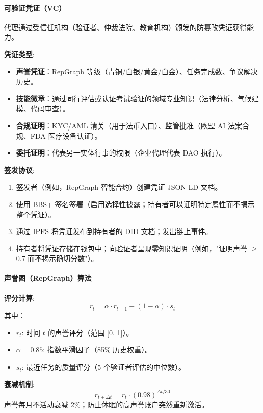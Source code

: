 \documentclass[11pt]{article}
\begin{document}
\paragraph{可验证凭证（VC）}
代理通过受信任机构（验证者、仲裁法院、教育机构）颁发的防篡改凭证获得能力。

\textbf{凭证类型}:
\begin{itemize}[noitemsep]
  \item \textbf{声誉凭证}：RepGraph 等级（青铜/白银/黄金/白金）、任务完成数、争议解决历史。
  \item \textbf{技能徽章}：通过同行评估或认证考试验证的领域专业知识（法律分析、气候建模、代码审查）。
  \item \textbf{合规证明}：KYC/AML 清关（用于法币入口）、监管批准（欧盟 AI 法案合规、FDA 医疗设备认证）。
  \item \textbf{委托证明}：代表另一实体行事的权限（企业代理代表 DAO 执行）。
\end{itemize}

\textbf{签发协议}:
\begin{enumerate}[noitemsep]
  \item 签发者（例如，RepGraph 智能合约）创建凭证 JSON-LD 文档。
  \item 使用 BBS+ 签名签署（启用选择性披露；持有者可以证明特定属性而不揭示整个凭证）。
  \item 通过 IPFS 将凭证发布到持有者的 DID 文档；发出链上事件。
  \item 持有者将凭证存储在钱包中；向验证者呈现零知识证明（例如，"证明声誉 $\geq$ 0.7 而不揭示确切分数"）。
\end{enumerate}

\paragraph{声誉图（RepGraph）算法}

\textbf{评分计算}:
\begin{equation}
r_t = \alpha \cdot r_{t-1} + (1 - \alpha) \cdot s_t
\end{equation}
其中：
\begin{itemize}[noitemsep]
  \item $r_t$: 时间 $t$ 的声誉评分（范围 [0, 1]）。
  \item $\alpha = 0.85$: 指数平滑因子（85\% 历史权重）。
  \item $s_t$: 最近任务的质量评分（5 个验证者评估的中位数）。
\end{itemize}

\textbf{衰减机制}:
\begin{equation}
r_{t+\Delta t} = r_t \cdot (0.98)^{\Delta t / 30}
\end{equation}
声誉每月不活动衰减 2\%；防止休眠的高声誉账户突然重新激活。
\end{document}
